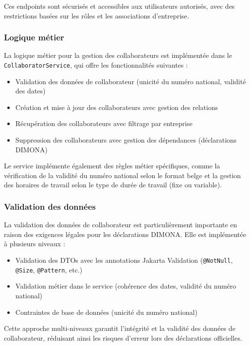 Ces endpoints sont sécurisés et accessibles aux utilisateurs autorisés, avec des restrictions basées sur les rôles et les associations d'entreprise.

\subsubsection{Logique métier}

La logique métier pour la gestion des collaborateurs est implémentée dans le \texttt{CollaboratorService}, qui offre les fonctionnalités suivantes :

\begin{itemize}
  \item Validation des données de collaborateur (unicité du numéro national, validité des dates)
  \item Création et mise à jour des collaborateurs avec gestion des relations
  \item Récupération des collaborateurs avec filtrage par entreprise
  \item Suppression des collaborateurs avec gestion des dépendances (déclarations DIMONA)
\end{itemize}

Le service implémente également des règles métier spécifiques, comme la vérification de la validité du numéro national selon le format belge et la gestion des horaires de travail selon le type de durée de travail (fixe ou variable).

\subsubsection{Validation des données}

La validation des données de collaborateur est particulièrement importante en raison des exigences légales pour les déclarations DIMONA. Elle est implémentée à plusieurs niveaux :

\begin{itemize}
  \item Validation des DTOs avec les annotations Jakarta Validation (\texttt{@NotNull}, \texttt{@Size}, \texttt{@Pattern}, etc.)
  \item Validation métier dans le service (cohérence des dates, validité du numéro national)
  \item Contraintes de base de données (unicité du numéro national)
\end{itemize}

Cette approche multi-niveaux garantit l'intégrité et la validité des données de collaborateur, réduisant ainsi les risques d'erreur lors des déclarations officielles.

